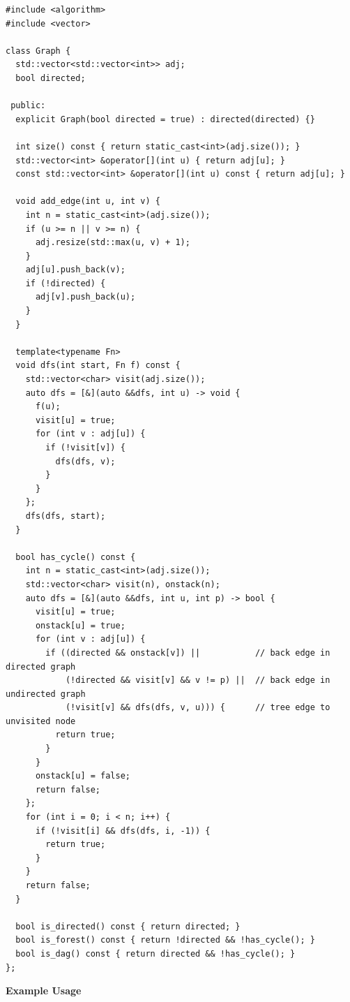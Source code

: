 \begin{lstlisting}[style=cpp]
#include <algorithm>
#include <vector>

class Graph {
  std::vector<std::vector<int>> adj;
  bool directed;

 public:
  explicit Graph(bool directed = true) : directed(directed) {}

  int size() const { return static_cast<int>(adj.size()); }
  std::vector<int> &operator[](int u) { return adj[u]; }
  const std::vector<int> &operator[](int u) const { return adj[u]; }

  void add_edge(int u, int v) {
    int n = static_cast<int>(adj.size());
    if (u >= n || v >= n) {
      adj.resize(std::max(u, v) + 1);
    }
    adj[u].push_back(v);
    if (!directed) {
      adj[v].push_back(u);
    }
  }

  template<typename Fn>
  void dfs(int start, Fn f) const {
    std::vector<char> visit(adj.size());
    auto dfs = [&](auto &&dfs, int u) -> void {
      f(u);
      visit[u] = true;
      for (int v : adj[u]) {
        if (!visit[v]) {
          dfs(dfs, v);
        }
      }
    };
    dfs(dfs, start);
  }

  bool has_cycle() const {
    int n = static_cast<int>(adj.size());
    std::vector<char> visit(n), onstack(n);
    auto dfs = [&](auto &&dfs, int u, int p) -> bool {
      visit[u] = true;
      onstack[u] = true;
      for (int v : adj[u]) {
        if ((directed && onstack[v]) ||           // back edge in directed graph
            (!directed && visit[v] && v != p) ||  // back edge in undirected graph
            (!visit[v] && dfs(dfs, v, u))) {      // tree edge to unvisited node
          return true;
        }
      }
      onstack[u] = false;
      return false;
    };
    for (int i = 0; i < n; i++) {
      if (!visit[i] && dfs(dfs, i, -1)) {
        return true;
      }
    }
    return false;
  }

  bool is_directed() const { return directed; }
  bool is_forest() const { return !directed && !has_cycle(); }
  bool is_dag() const { return directed && !has_cycle(); }
};
\end{lstlisting}
\textbf{Example Usage}\par
